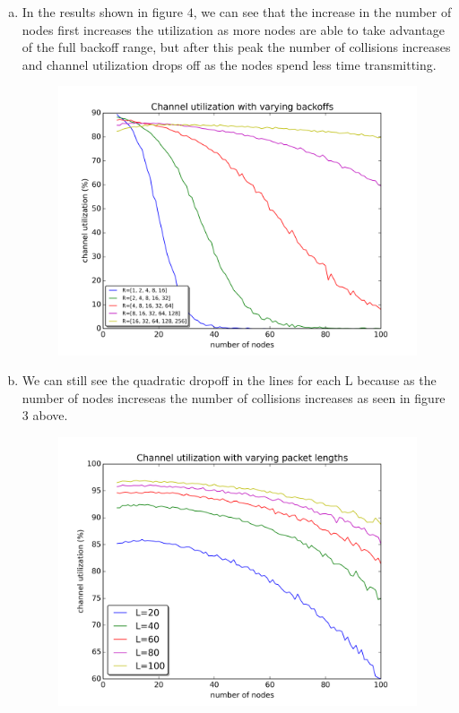 \documentclass[11pt]{article}
\begin{document}
\begin{enumerate}[a.]
\newpage

\item In the results shown in figure $4$, we can see that the increase in the number of nodes first increases the utilization as more nodes are able to take advantage of the full backoff range, but after this peak the number of collisions increases and channel utilization drops off as the nodes spend less time transmitting.

\begin{figure}[H]
\centering
\includegraphics[width=.9\textwidth]{partD.png}
\caption{}
\end{figure}

\newpage

\item We can still see the quadratic dropoff in the lines for each L because as the number of nodes increseas the number of collisions increases as seen in figure 3 above. 

\begin{figure}[H]
\centering
\includegraphics[width=.9\textwidth]{partE.png}
\caption{}
\end{figure}


\end{enumerate}
\end{document}
